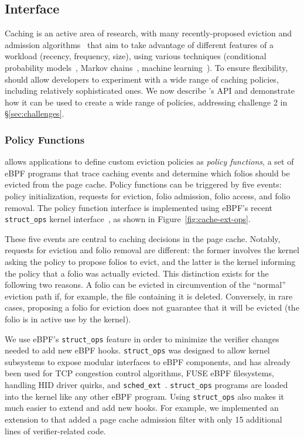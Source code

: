 \subsection{Interface}
\label{subsec:kernel-impl}
Caching is an active area of research, with many recently-proposed eviction and admission algorithms~\cite{adaptsize,robinhood,lhd,lrb,baleen,sieve,s3-fifo,ripq} that aim to take advantage of different features of a workload (\eg recency, frequency, size), using various techniques (\eg conditional probability models~\cite{lhd}, Markov chains~\cite{adaptsize}, machine learning~\cite{lrb}).
To ensure flexibility, \name should allow developers to experiment with a wide range of caching policies, including relatively sophisticated ones. We now describe \name's API and demonstrate how it can be used to create a wide range of policies, addressing challenge 2 in \S\ref{sec:challenges}.


\subsubsection{Policy Functions}
\label{subsubsec:design_policy_functions}

\name allows applications to define custom eviction policies %
as \emph{policy functions}, a set of eBPF programs that trace caching events and determine which folios should be evicted from the page cache. 
Policy functions can be triggered by five events: policy initialization, requests for eviction, folio admission, folio access, and folio removal. The policy function interface is implemented using eBPF's recent \texttt{struct\_ops} kernel interface~\cite{struct-ops}, as shown in Figure~\ref{fig:cache-ext-ops}.

These five events are central to caching decisions in the page cache. %
Notably, requests for eviction and folio removal are different: the former involves the kernel asking the policy to propose folios to evict, and the latter is the kernel informing the policy that a folio was actually evicted. This distinction exists for the following two reasons. A folio can be evicted in circumvention of the ``normal'' eviction path if, for example, the file containing it is deleted. Conversely, in rare cases, proposing a folio for eviction does not guarantee that it will be evicted (\eg the folio is in active use by the kernel).

We use eBPF's \texttt{struct\_ops} feature in order to minimize the verifier changes needed to add new eBPF hooks. \texttt{struct\_ops} was designed to allow kernel subsystems to expose modular interfaces to eBPF components, and has already been used for TCP congestion control algorithms, FUSE eBPF filesystems, handling HID driver quirks, and \texttt{sched\_ext}~\cite{sched_ext,fuse-bpf,bpf-extensible-network,hid-bpf}. \texttt{struct\_ops} programs are loaded into the kernel like any other eBPF program.
Using \texttt{struct\_ops} also makes it much easier to extend \name and add new hooks. For example, we implemented an extension to \name that added a page cache admission filter with only 15 additional lines of verifier-related code.





